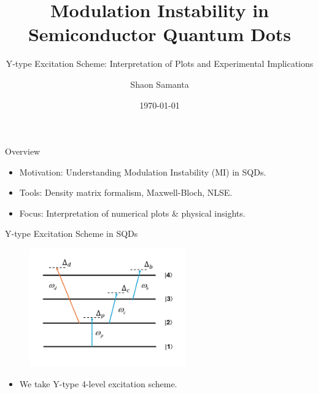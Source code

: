\documentclass{beamer}
\title{Modulation Instability in Semiconductor Quantum Dots}
\subtitle{Y-type Excitation Scheme: Interpretation of Plots and Experimental Implications}
\author{Shaon Samanta}
\institute{Department of Physics}
\date{\today}
\begin{document}
\frame{\titlepage}

\begin{frame}{Overview}
  \vspace{-3pt}
  \begin{itemize}
    \item Motivation: Understanding Modulation Instability (MI) in SQDs.
    \item Tools: Density matrix formalism, Maxwell-Bloch, NLSE\@.
    \item Focus: Interpretation of numerical plots \& physical insights.
  \end{itemize}
\end{frame}

\begin{frame}{Y-type Excitation Scheme in SQDs}
  \vspace{-50pt}
  \begin{figure}
    \includegraphics[width=0.6\textwidth]{Assets/Y-type.png}
  \end{figure}
  \begin{itemize}
    \item We take Y-type 4-level excitation scheme.
  \end{itemize}
\end{frame}
\end{document}
